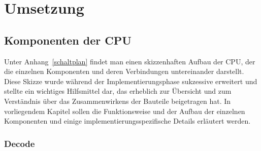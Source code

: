 \iffalse
Herausforderungen:
\TDOD: RAM als RAM erkennen
\TODO: Probleme: ALU und Decode erst clk-sensitiv implementiert
\TODO: latches
\TODO: ELF, 
\TODO: sign extension bei Load erwähnen


Sonstiges:
\TODO: links zu Quellcode
\TODO: Block RAM im code umbenennen
\TODO: Komponente Main
\TODO: maschinenbefehle durchgehen: wurde etwas besonders implementiert?
\TODO: warum zwei Takte? => Schreibzugriff RAM, Register...?
\TODO: synchrones design
\TODO: Register erklären?
\TODO: ALU zero-flag-next entfernen
\TODO: Warnings entfernen
\fi

\chapter{Umsetzung} %
\label{Umsetzung} %

\section{Komponenten der CPU}

Unter Anhang~\ref{schaltplan} findet man einen skizzenhaften Aufbau der CPU, der die einzelnen Komponenten und deren Verbindungen untereinander darstellt.
Diese Skizze wurde während der Implementierungsphase sukzessive erweitert und stellte ein wichtiges Hilfsmittel dar, das erheblich zur Übersicht und zum Verständnis über das Zusammenwirkens der Bauteile beigetragen hat.
In vorliegendem Kapitel sollen die Funktionsweise und der Aufbau der einzelnen Komponenten und einige implementierungsspezifische Details erläutert werden.

\subsection{Decode}

